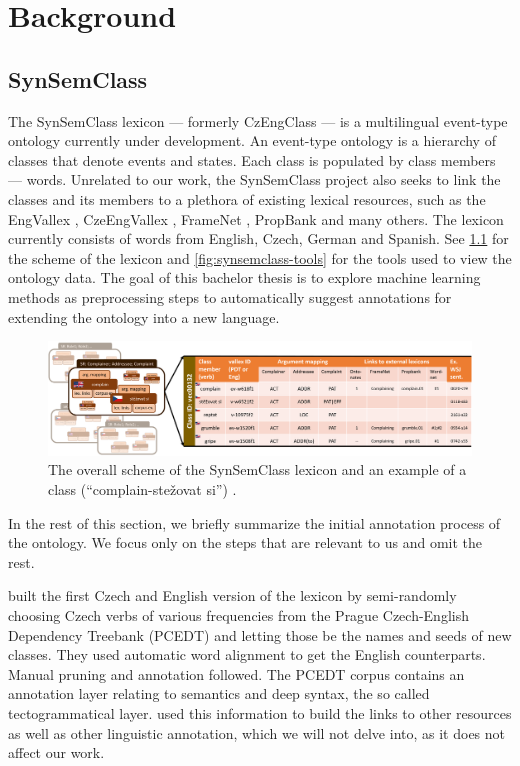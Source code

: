\chapter{Background}


\section{SynSemClass}

The SynSemClass lexicon \parencite{uresova-etal-2020-synsemclass} --- formerly CzEngClass --- is a multilingual event-type ontology currently under development. An event-type ontology is a hierarchy of classes that denote events and states. Each class is populated by class members --- words. Unrelated to our work, the SynSemClass project also seeks to link the classes and its members to a plethora of existing lexical resources, such as the EngVallex \parencite{EngVallex20}, CzeEngVallex \parencite{czengvallex}, FrameNet \parencite{ruppenhofer2016framenet}, PropBank \parencite{kingsbury2002treebank} and many others. The lexicon currently consists of words from English, Czech, German and Spanish. See \cref{fig:synsemclass-scheme} for the scheme of the lexicon and \cref{fig:synsemclass-tools} for the tools used to view the ontology data. The goal of this bachelor thesis is to explore machine learning methods as preprocessing steps to automatically suggest annotations for extending the ontology into a new language.

\begin{figure}[h]
\centering
\includegraphics[width=0.9\linewidth]{img/06-final-ssclass-scheme}
\caption{The overall scheme of the SynSemClass lexicon and an example of a class (“complain-stežovat si”) \parencite{uresova-etal-2020-synsemclass}.}
\label{fig:synsemclass-scheme}
\end{figure}

In the rest of this section, we briefly summarize the initial annotation process of the ontology. We focus only on the steps that are relevant to us and omit the rest.

\citet{ssc_start} built the first Czech and English version of the lexicon by semi-randomly choosing Czech verbs of various frequencies from the Prague Czech-English Dependency Treebank (PCEDT) \parencite{pcedt} and letting those be the names and seeds of new classes. They used automatic word alignment to get the English counterparts. Manual pruning and annotation followed. The PCEDT corpus contains an annotation layer relating to semantics and deep syntax, the so called tectogrammatical layer. \citet{ssc_start} used this information to build the links to other resources as well as other linguistic annotation, which we will not delve into, as it does not affect our work. 

